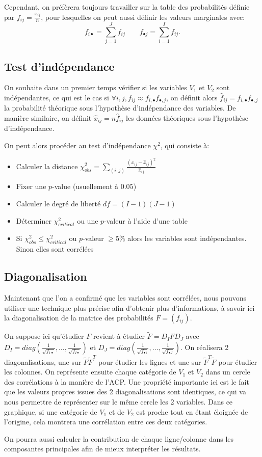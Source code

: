 Cependant, on préfèrera toujours travailler sur la table des probabilités définie par $f_{ij} = \frac{x_{ij}}{n}$, pour lesquelles on peut aussi définir les valeurs marginales avec: 
\begin{equation}
  f_{i\bullet} = \sum_{j=1}^J f_{ij} \qquad
  f_{\bullet j} = \sum_{i=1}^I f_{ij}.
\end{equation}

\subsection{Test d'indépendance}

On souhaite dans un premier temps vérifier si les variables $V_1$ et $V_2$ sont indépendantes, ce qui est le cas si $\forall i, j, f_{ij} \approx f_{i,\bullet}f_{\bullet, j}$, on définit alors $\hat{f}_{ij} = f_{i,\bullet}f_{\bullet, j}$ la probabilité théorique sous l'hypothèse d'indépendance des variables. 
De manière similaire, on définit $\hat{x}_{ij} = n\hat{f}_{ij}$ les données théoriques sous l'hypothèse d'indépendance. 

On peut alors procéder au test d'indépendance $\chi^2$, qui consiste à:
\begin{itemize}
  \item Calculer la distance $\chi_{obs}^2 = \sum_{(i,j)} \frac{(x_{ij} - \hat{x}_{ij})^2}{\hat{x}_{ij}}$ 
  \item Fixer une $p$-value (usuellement à $0.05$)
  \item Calculer le degré de liberté $df = (I - 1)(J - 1)$ 
  \item Déterminer $\chi_{critical}^2$ ou une $p$-valeur à l'aide d'une table 
  \item Si $\chi_{obs}^2 \leq \chi_{critical}^2$ ou $p$-valeur $\geq 5\%$ alors les variables sont indépendantes. Sinon elles sont corrélées
\end{itemize}

\subsection{Diagonalisation}

Maintenant que l'on a confirmé que les variables sont corrélées, nous pouvons utiliser une technique plus précise afin d'obtenir plus d'informations, à savoir ici la diagonalisation de la matrice des probabilités $F = (f_{ij})$.

On suppose ici qu'étudier $F$ revient à étudier $\tilde{F} = D_IFD_J$ avec $D_I = diag(\frac{1}{\sqrt{f_{1 \bullet}}}, \dots, \frac{1}{\sqrt{f_{I\bullet}}})$ et $D_J = diag(\frac{1}{\sqrt{f_{\bullet 1}}}, \dots, \frac{1}{\sqrt{f_{\bullet J}}})$.
On réalisera 2 diagonalisations, une sur $\tilde{F}\tilde{F}^T$ pour étudier les lignes et une sur $\tilde{F}^T\tilde{F}$ pour étudier les colonnes.
On représente ensuite chaque catégorie de $V_1$ et $V_2$ dans un cercle des corrélations à la manière de l'ACP.
Une propriété importante ici est le fait que les valeurs propres issues des 2 diagonalisations sont identiques, ce qui va nous permettre de représenter sur le même cercle les 2 variables. Dans ce graphique, si une catégorie de $V_1$ et de $V_2$ est proche tout en étant éloignée de l'origine, cela montrera une corrélation entre ces deux catégories.

On pourra aussi calculer la contribution de chaque ligne/colonne dans les composantes principales afin de mieux interpréter les résultats.
